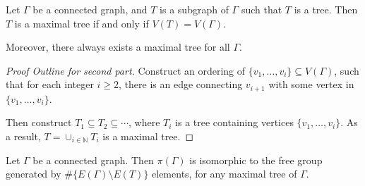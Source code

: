 \begin{theorem}
Let $\Gamma$ be a connected graph, and $T$ is a subgraph of $\Gamma$ such that $T$ is a tree.
Then $T$ is a maximal tree if and only if $V(T)=V(\Gamma)$.

Moreover, there always exists a maximal tree for all $\Gamma$.
\end{theorem}
\begin{proof}[Proof Outline for second part]
Construct an ordering of $\{v_1,\dots,v_i\}\subseteq V(\Gamma)$, such that for each integer $i\ge2$, 
there is an edge connecting $v_{i+1}$ with some vertex in $\{v_1,\dots,v_i\}$.

Then construct $T_1\subseteq T_2\subseteq\cdots$, where $T_i$ is a tree containing vertices $\{v_1,\dots,v_i\}$.
As a result, $T=\cup_{i\in\mathbb{N}}T_i$ is a maximal tree.
\end{proof}

\begin{theorem}
Let $\Gamma$ be a connected graph.
Then $\pi(\Gamma)$ is isomorphic to the free group generated by $\#\{E(\Gamma)\setminus E(T)\}$ elements,
for any maximal tree of $\Gamma$.
\end{theorem}

